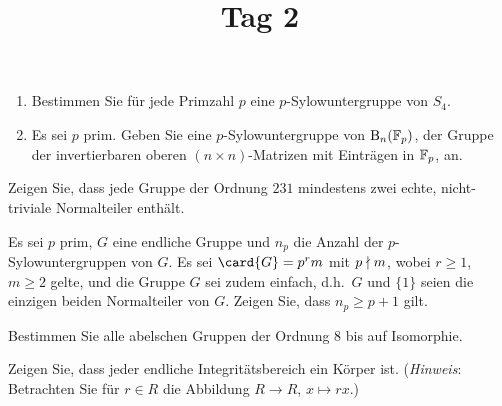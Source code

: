 \documentclass[a4paper, 10pt]{scrartcl}
\title{Tag 2}
\author{}
\date{}
\begin{document}
\begin{question}
  \begin{enumerate}
    \item
      Bestimmen Sie für jede Primzahl $p$ eine $p$-Sylowuntergruppe von $S_4$.
    \item
      Es sei $p$ prim.
      Geben Sie eine $p$-Sylowuntergruppe von $\operatorname{B}_{n}(\mathbb{F}_p)$, der Gruppe der invertierbaren oberen $(n \times n)$-Matrizen mit Einträgen in $\mathbb{F}_p$, an.
  \end{enumerate}
\end{question}

\begin{question}
  Zeigen Sie, dass jede Gruppe der Ordnung $231$ mindestens zwei echte, nicht-triviale Normalteiler enthält.
\end{question}

\begin{question}
  Es sei $p$ prim, $G$ eine endliche Gruppe und $n_p$ die Anzahl der $p$-Sylowuntergruppen von $G$.
  Es sei $\card{G} = p^r m$ mit $p \mathrel{\nmid} m$, wobei $r \geq 1$, $m \geq 2$ gelte, und die Gruppe $G$ sei zudem einfach, d.h.\ $G$ und $\{1\}$ seien die einzigen beiden Normalteiler von $G$.
  Zeigen Sie, dass $n_p \geq p + 1$ gilt.
\end{question}


\begin{question}
  Bestimmen Sie alle abelschen Gruppen der Ordnung $8$ bis auf Isomorphie.
\end{question}

\begin{question}
  Zeigen Sie, dass jeder endliche Integritätsbereich ein Körper ist.
  \newline
  (\emph{Hinweis}:
  Betrachten Sie für $r \in R$ die Abbildung $R \to R$, $x \mapsto rx$.)
\end{question}
\end{document}
